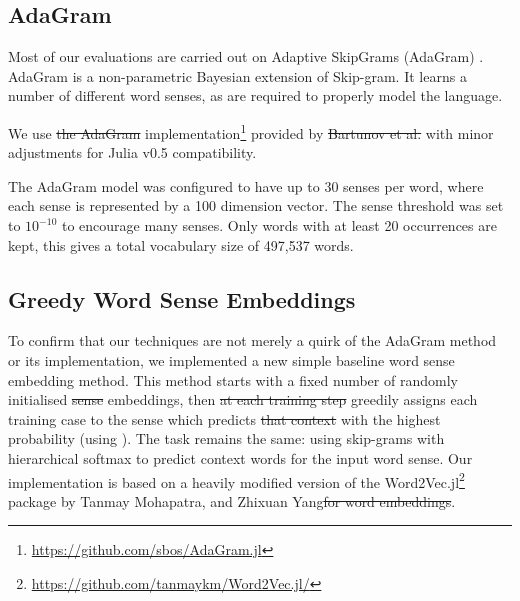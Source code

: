 \documentclass{article} %
\def\parencite{\cite} %
\providecommand{\DIFadd}[1]{{\protect\color{blue}\uwave{#1}}} %
\providecommand{\DIFdel}[1]{{\protect\color{red}\sout{#1}}}                      %
\providecommand{\DIFaddbegin}{} %
\providecommand{\DIFaddend}{} %
\providecommand{\DIFdelbegin}{} %
\providecommand{\DIFdelend}{} %
\begin{document}
\subsection{AdaGram}
Most of our evaluations are carried out on Adaptive SkipGrams (AdaGram) \parencite{AdaGrams}. AdaGram is a non-parametric Bayesian extension of Skip-gram. It learns a number of different word senses, as are required to properly model the language.

We use \DIFdelbegin \DIFdel{the AdaGram  }\DIFdelend implementation\footnote{\url{https://github.com/sbos/AdaGram.jl}} provided by \DIFdelbegin \DIFdel{Bartunov et al. }%
\DIFdelend \DIFaddbegin \DIFadd{the authors }\DIFaddend with minor adjustments for Julia \parencite{Julia} v0.5 compatibility.


The AdaGram model was configured to have up to 30 senses per word, where each sense is represented by a 100 dimension vector. 
The sense threshold was set to $10^{-10}$ to encourage many senses.
Only words with at least 20 occurrences are kept, this gives a total vocabulary size of 497,537 words.



\subsection{Greedy Word Sense Embeddings}

To confirm that our techniques are not merely a quirk of the AdaGram method or its implementation, we implemented a new simple baseline word sense embedding method.
This method starts with a fixed number of randomly initialised \DIFdelbegin \DIFdel{sense }\DIFdelend embeddings, then \DIFdelbegin \DIFdel{at each training step }\DIFdelend greedily assigns each training case to the sense which predicts \DIFdelbegin \DIFdel{that context }\DIFdelend \DIFaddbegin \DIFadd{it }\DIFaddend with the highest probability (using ). The task remains the same: using skip-grams with hierarchical softmax to predict \DIFaddbegin \DIFadd{the }\DIFaddend context words for the input word sense.
Our implementation is based on a heavily modified version of the Word2Vec.jl\footnote{\url{https://github.com/tanmaykm/Word2Vec.jl/}} package by Tanmay Mohapatra, and Zhixuan Yang\DIFdelbegin \DIFdel{for word embeddings}\DIFdelend .
\end{document}
